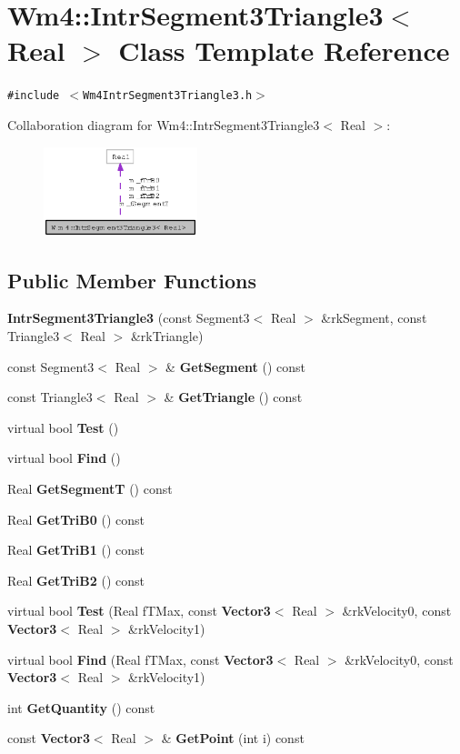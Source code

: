 \section{Wm4::Intr\-Segment3Triangle3$<$ Real $>$ Class Template Reference}
\label{classWm4_1_1IntrSegment3Triangle3}
{\tt \#include $<$Wm4Intr\-Segment3Triangle3.h$>$}

Collaboration diagram for Wm4::Intr\-Segment3Triangle3$<$ Real $>$:\begin{figure}[H]
\begin{center}
\leavevmode
\includegraphics[width=127pt]{classWm4_1_1IntrSegment3Triangle3__coll__graph}
\end{center}
\end{figure}
\subsection*{Public Member Functions}
\begin{CompactItemize}
\item 
{\bf Intr\-Segment3Triangle3} (const Segment3$<$ Real $>$ \&rk\-Segment, const Triangle3$<$ Real $>$ \&rk\-Triangle)
\item 
const Segment3$<$ Real $>$ \& {\bf Get\-Segment} () const
\item 
const Triangle3$<$ Real $>$ \& {\bf Get\-Triangle} () const
\item 
virtual bool {\bf Test} ()
\item 
virtual bool {\bf Find} ()
\item 
Real {\bf Get\-Segment\-T} () const
\item 
Real {\bf Get\-Tri\-B0} () const
\item 
Real {\bf Get\-Tri\-B1} () const
\item 
Real {\bf Get\-Tri\-B2} () const
\item 
virtual bool {\bf Test} (Real f\-TMax, const {\bf Vector3}$<$ Real $>$ \&rk\-Velocity0, const {\bf Vector3}$<$ Real $>$ \&rk\-Velocity1)
\item 
virtual bool {\bf Find} (Real f\-TMax, const {\bf Vector3}$<$ Real $>$ \&rk\-Velocity0, const {\bf Vector3}$<$ Real $>$ \&rk\-Velocity1)
\item 
int {\bf Get\-Quantity} () const
\item 
const {\bf Vector3}$<$ Real $>$ \& {\bf Get\-Point} (int i) const
\end{CompactItemize}
